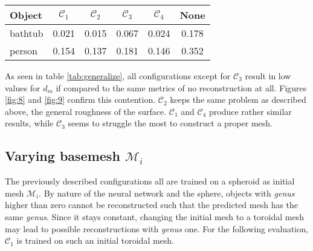 \begin{center}
     \label{tab:generalize} 
    \begin{center}
        \begin{tabular}{| l  | c | c | c | c || c |}
            \hline
            Object& $\mathcal{C}_1$ & $\mathcal{C}_2$ & $\mathcal{C}_3$ & $\mathcal{C}_4$ & None\\ \hline
            bathtub&0.021&0.015&0.067&0.024 & 0.178\\\hline
            person&0.154&0.137&0.181&0.146 & 0.352\\\hline
        \end{tabular}
    \end{center}
\end{center}

    As seen in table \ref{tab:generalize}, all configurations except for $\mathcal{C}_3$ result in low values for $d_m$ if
    compared to the same metrics of no reconstruction at all. Figures \ref{fig:8} and \ref{fig:9} confirm this contention.
    $\mathcal{C}_2$ keeps the same problem as described above, the general roughness of the surface. $\mathcal{C}_1$ and
    $\mathcal{C}_4$ produce rather similar results, while $\mathcal{C}_3$ seems to struggle the most to construct a proper mesh.

\subsection{Varying basemesh $\mathcal{M}_i$}
\label{varybase}
    The previously described configurations all are trained on a spheroid as initial mesh $\mathcal{M}_i$. 
    By nature of the neural network and the sphere, objects with \emph{genus} higher than zero cannot be
    reconstructed such that the predicted mesh has the same \emph{genus}. Since it stays constant, 
    changing the initial mesh to a toroidal mesh may lead to possible reconstructions with \emph{genus} one. 
    For the following evaluation, $\mathcal{C}_{1}$ is trained on such an initial toroidal mesh.

